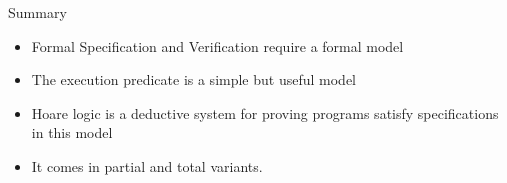 \documentclass[xetex,aspectratio=169,14pt,hyperref={pdfpagelabels=true,pdflang={en-GB}}]{beamer}
\begin{document}
\begin{frame}
  {Summary}

  \begin{itemize}
  \item Formal Specification and Verification require a formal model
  \item The execution predicate is a simple but useful model
  \item Hoare logic is a deductive system for proving programs satisfy specifications in this model
  \item It comes in partial and total variants.
  \end{itemize}
\end{frame}










\end{document}
